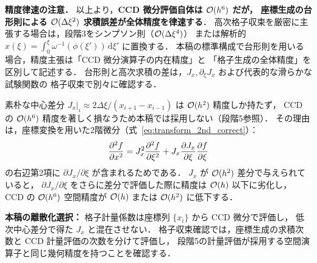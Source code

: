 \noindent\textbf{精度律速の注意．}
\label{sec:grid_metric_order_note}
以上より，\textbf{CCD 微分評価自体は $\mathcal{O}(h^6)$ だが，
座標生成の台形則による $\mathcal{O}(\Delta\xi^2)$ 求積誤差が全体精度を律速する}．
高次格子収束を厳密に主張する場合は，段階3をシンプソン則（$\mathcal{O}(\Delta\xi^4)$）
または解析的 $x(\xi) = \int_0^\xi \omega^{-1}(\phi(\xi'))\,\mathrm{d}\xi'$ に置換する．
本稿の標準構成で台形則を用いる場合，精度主張は「CCD 微分演算子の内在精度」と
「格子生成の全体精度」を区別して記述する．
台形則と高次求積の差は，$J_x,\partial_\xi J_x$ および代表的な滑らかな試験関数の
格子収束で別々に確認する．

\begin{tcolorbox}[warnbox, title={計量係数 $J_x$ の精度と $\partial J_x/\partial\xi$ の評価}]
\label{box:grid_jx_accuracy}
素朴な中心差分 $J_x|_i \approx 2\Delta\xi/(x_{i+1}-x_{i-1})$ は $\mathcal{O}(h^2)$ 精度しか持たず，
CCD の $\mathcal{O}(h^6)$ 精度を著しく損なうため本稿では採用しない（段階5参照）．
その理由は，座標変換を用いた2階微分（式~\eqref{eq:transform_2nd_correct}）：
\[
  \dfrac{\partial^2 f}{\partial x^2} = J_x^2 \dfrac{\partial^2 f}{\partial \xi^2} + J_x \dfrac{\partial J_x}{\partial \xi} \dfrac{\partial f}{\partial \xi}
\]
の右辺第2項に $\partial J_x/\partial \xi$ が含まれるためである．
$J_x$ が $\mathcal{O}(h^2)$ 差分で与えられていると，
$\partial J_x/\partial\xi$ をさらに差分で評価した際に精度は $\mathcal{O}(h)$ 以下に劣化し，
CCD の $\mathcal{O}(h^6)$ 空間精度が $\mathcal{O}(h)$ または $\mathcal{O}(h^2)$ に低下する．
\end{tcolorbox}

\textbf{本稿の離散化選択：}
格子計量係数は座標列 $\{x_i\}$ から CCD 微分で評価し，
低次中心差分で得た $J_x$ と混在させない．
格子収束確認では，座標生成の求積次数と CCD 計量評価の次数を分けて評価し，
段階5の計量評価が採用する空間演算子と同じ幾何精度を持つことを確認する．

